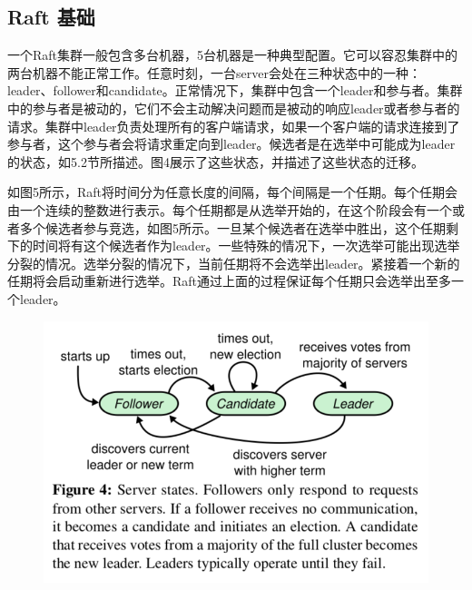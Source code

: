 \documentclass[journal]{IEEEtran}
\begin{document}
\subsection{Raft 基础}
一个Raft集群一般包含多台机器，5台机器是一种典型配置。它可以容忍集群中的两台机器不能正常工作。任意时刻，一台server会处在三种状态中的一种：leader、follower和candidate。正常情况下，集群中包含一个leader和参与者。集群中的参与者是被动的，它们不会主动解决问题而是被动的响应leader或者参与者的请求。集群中leader负责处理所有的客户端请求，如果一个客户端的请求连接到了参与者，这个参与者会将请求重定向到leader。候选者是在选举中可能成为leader的状态，如5.2节所描述。图4展示了这些状态，并描述了这些状态的迁移。


如图5所示，Raft将时间分为任意长度的间隔，每个间隔是一个任期。每个任期会由一个连续的整数进行表示。每个任期都是从选举开始的，在这个阶段会有一个或者多个候选者参与竞选，如图5所示。一旦某个候选者在选举中胜出，这个任期剩下的时间将有这个候选者作为leader。一些特殊的情况下，一次选举可能出现选举分裂的情况。选举分裂的情况下，当前任期将不会选举出leader。紧接着一个新的任期将会启动重新进行选举。Raft通过上面的过程保证每个任期只会选举出至多一个leader。

\begin{figure}[htbp]
\begin{center}
\includegraphics[width=1\linewidth]{./fig4.png}
\end{center}
\end{figure}
\end{document}
